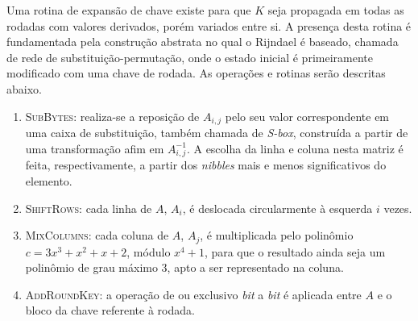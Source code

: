 \documentclass{ufsctex/ufsctex}
\begin{document}
Uma rotina de expansão de chave existe para que $K$ seja propagada em todas as
rodadas com valores derivados, porém variados entre si. A presença desta rotina
é fundamentada pela construção abstrata no qual o Rijndael é baseado, chamada
de rede de substituição-permutação, onde o estado inicial é primeiramente
modificado com uma chave de rodada. As operações e rotinas serão descritas
abaixo.

\begin{enumerate}[label=\roman*.]

  \item \textsc{SubBytes}: realiza-se a reposição de $A_{i, j}$ pelo seu valor
      correspondente em uma caixa de substituição, também chamada de
        \emph{S-box}, construída a partir de uma transformação afim em $A_{i,
        j}^{-1}$. A escolha da linha e coluna nesta matriz é feita,
        respectivamente, a partir dos \emph{nibbles} mais e menos
        significativos do elemento.

  \item \textsc{ShiftRows}: cada linha de $A$, $A_{i}$, é deslocada
      circularmente à esquerda $i$ vezes.

  \item \textsc{MixColumns}: cada coluna de $A$, $A_{j}$, é multiplicada pelo
      polinômio $c = 3x^{3} + x^{2} + x + 2$, módulo $x^{4} + 1$, para que o
        resultado ainda seja um polinômio de grau máximo 3, apto a ser
        representado na coluna.

  \item \textsc{AddRoundKey}: a operação de ou exclusivo \emph{bit} a
      \emph{bit} é aplicada entre $A$ e o bloco da chave referente à rodada.


\end{enumerate}
\end{document}
